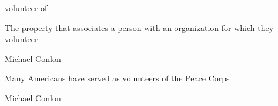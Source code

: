 \documentclass[letterpaper,10pt,english]{sphinxmanual}
\begin{document}
\begin{sphinxShadowBox}

\sphinxAtStartPar
volunteer of
\end{sphinxShadowBox}

\begin{sphinxShadowBox}

\sphinxAtStartPar
{}
\end{sphinxShadowBox}

\begin{sphinxShadowBox}

\sphinxAtStartPar
The property that associates a person with an organization for which they volunteer
\end{sphinxShadowBox}

\begin{sphinxShadowBox}

\sphinxAtStartPar
Michael Conlon 
\end{sphinxShadowBox}

\begin{sphinxShadowBox}

\sphinxAtStartPar
{\hyperref[\detokenize{doc-NCBITaxon_9606::doc}]{}}
\end{sphinxShadowBox}

\begin{sphinxShadowBox}

\sphinxAtStartPar
{\hyperref[\detokenize{doc-ORG_0000001::doc}]{}}
\end{sphinxShadowBox}

\begin{sphinxShadowBox}

\sphinxAtStartPar
Many Americans have served as volunteers of the Peace Corps
\end{sphinxShadowBox}

\begin{sphinxShadowBox}

\sphinxAtStartPar
Michael Conlon 
\end{sphinxShadowBox}
\begin{quote}

\ignorespaces \end{quote}
\end{document}
